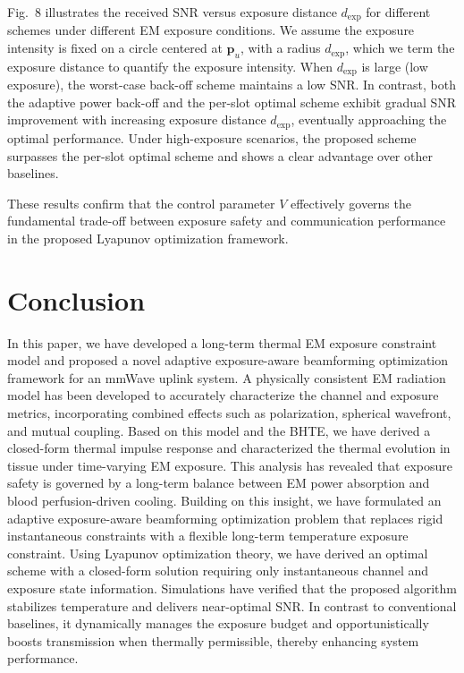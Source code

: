 \documentclass[journal]{IEEEtran}
\begin{document}
Fig.~8 illustrates the received SNR versus exposure distance $d_{\mathrm{exp}}$ for different schemes under different EM exposure conditions. We assume the exposure intensity is fixed on a circle centered at $\mathbf{p}_u$, with a radius $d_{\mathrm{exp}}$, which we term the exposure distance to quantify the exposure intensity. When $d_{\mathrm{exp}}$ is large (low exposure), the worst-case back-off scheme maintains a low SNR. In contrast, both the adaptive power back-off and the per-slot optimal scheme exhibit gradual SNR improvement with increasing exposure distance $d_{\mathrm{exp}}$, eventually approaching the optimal performance. Under high-exposure scenarios, the proposed scheme surpasses the per-slot optimal scheme and shows a clear advantage over other baselines.

These results confirm that the control parameter $V$ effectively governs the fundamental trade-off between exposure safety and communication performance in the proposed Lyapunov optimization framework.


\section{Conclusion}
\label{sec:conclusion}

In this paper, we have developed a long-term thermal EM exposure constraint model and proposed a novel adaptive exposure-aware beamforming optimization framework for an mmWave uplink system. A physically consistent EM radiation model has been developed to accurately characterize the channel and exposure metrics, incorporating combined effects such as polarization, spherical wavefront, and mutual coupling. Based on this model and the BHTE, we have derived a closed-form thermal impulse response and characterized the thermal evolution in tissue under time-varying EM exposure. This analysis has revealed that exposure safety is governed by a long-term balance between EM power absorption and blood perfusion-driven cooling. Building on this insight, we have formulated an adaptive exposure-aware beamforming optimization problem that replaces rigid instantaneous constraints with a flexible long-term temperature exposure constraint. Using Lyapunov optimization theory, we have derived an optimal scheme with a closed-form solution requiring only instantaneous channel and exposure state information. Simulations have verified that the proposed algorithm stabilizes temperature and delivers near-optimal SNR. In contrast to conventional baselines, it dynamically manages the exposure budget and opportunistically boosts transmission when thermally permissible, thereby enhancing system performance.
\end{document}
